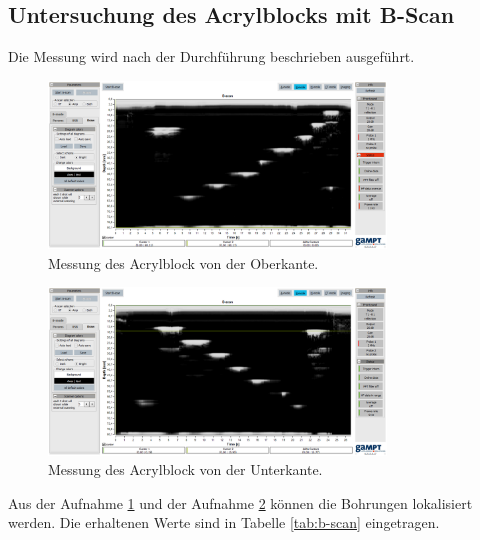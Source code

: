 \subsection{Untersuchung des Acrylblocks mit B-Scan}
Die Messung wird nach der Durchführung beschrieben ausgeführt.
\begin{figure}[H]
  \centering
  \includegraphics[width=0.8\textwidth]{content/bscan-2mhz_oberseite.png}
  \caption{Messung des Acrylblock von der Oberkante.}
  \label{fig:obs}
\end{figure}
\begin{figure}[H]
  \centering
  \includegraphics[width=0.8\textwidth]{content/bscan-2mhz_unterseite.png}
  \caption{Messung des Acrylblock von der Unterkante.}
  \label{fig:unts}
\end{figure}
\noindent Aus der Aufnahme \ref{fig:obs} und der Aufnahme \ref{fig:unts} können die Bohrungen lokalisiert werden.
Die erhaltenen Werte sind in Tabelle \ref{tab:b-scan} eingetragen.
